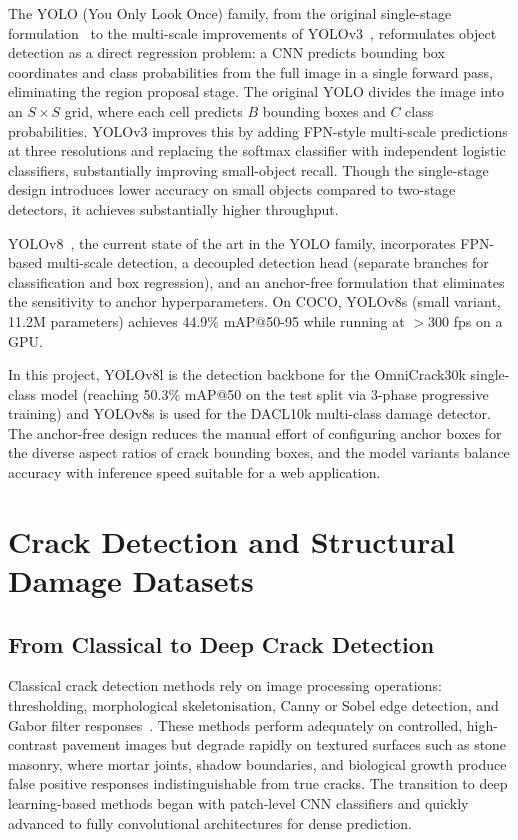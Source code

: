 \documentclass[12pt,a4paper]{article}
\begin{document}
The YOLO (You Only Look Once) family, from the original single-stage formulation~\cite{redmon2016yolo} to the multi-scale improvements of YOLOv3~\cite{surv:redmon2018yolov3}, reformulates object detection as a direct regression problem: a CNN predicts bounding box coordinates and class probabilities from the full image in a single forward pass, eliminating the region proposal stage. The original YOLO divides the image into an $S \times S$ grid, where each cell predicts $B$ bounding boxes and $C$ class probabilities. YOLOv3 improves this by adding FPN-style multi-scale predictions at three resolutions and replacing the softmax classifier with independent logistic classifiers, substantially improving small-object recall. Though the single-stage design introduces lower accuracy on small objects compared to two-stage detectors, it achieves substantially higher throughput.

YOLOv8~\cite{ultralytics2023}, the current state of the art in the YOLO family, incorporates FPN-based multi-scale detection, a decoupled detection head (separate branches for classification and box regression), and an anchor-free formulation that eliminates the sensitivity to anchor hyperparameters. On COCO, YOLOv8s (small variant, 11.2M parameters) achieves 44.9\% mAP@50-95 while running at $>$300 fps on a GPU.

In this project, YOLOv8l is the detection backbone for the OmniCrack30k single-class model (reaching 50.3\% mAP@50 on the test split via 3-phase progressive training) and YOLOv8s is used for the DACL10k multi-class damage detector. The anchor-free design reduces the manual effort of configuring anchor boxes for the diverse aspect ratios of crack bounding boxes, and the model variants balance accuracy with inference speed suitable for a web application.

\section{Crack Detection and Structural Damage Datasets}
\label{surv:sec:crack}

\subsection{From Classical to Deep Crack Detection}

Classical crack detection methods rely on image processing operations: thresholding, morphological skeletonisation, Canny or Sobel edge detection, and Gabor filter responses~\cite{surv:zou2012cracktree}. These methods perform adequately on controlled, high-contrast pavement images but degrade rapidly on textured surfaces such as stone masonry, where mortar joints, shadow boundaries, and biological growth produce false positive responses indistinguishable from true cracks. The transition to deep learning-based methods began with patch-level CNN classifiers and quickly advanced to fully convolutional architectures for dense prediction.
\end{document}
